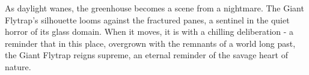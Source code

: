 As daylight wanes, the greenhouse becomes a scene from a nightmare. The Giant Flytrap's silhouette looms against the fractured panes, a sentinel in the quiet horror of its glass domain. When it moves, it is with a chilling deliberation - a reminder that in this place, overgrown with the remnants of a world long past, the Giant Flytrap reigns supreme, an eternal reminder of the savage heart of nature.
\vfill\eject
{}%
